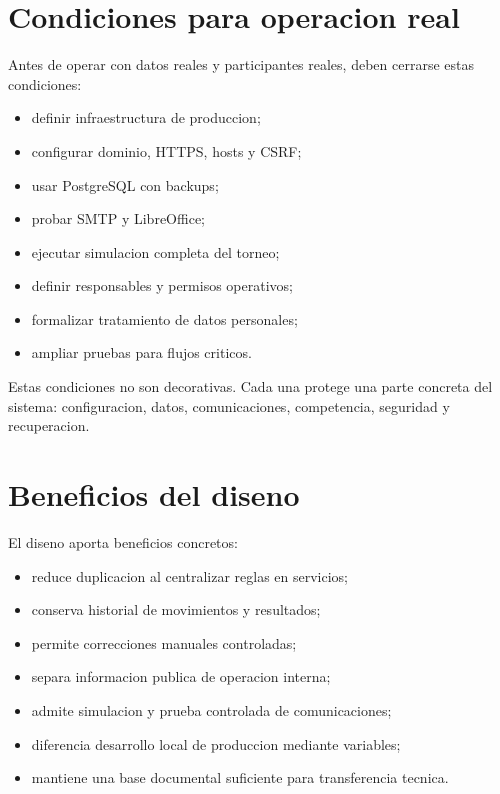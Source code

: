 \section{Condiciones para operacion real}
\label{sec:conclusiones-operacion}

Antes de operar con datos reales y participantes reales, deben cerrarse estas condiciones:

\begin{itemize}
  \item definir infraestructura de produccion;
  \item configurar dominio, HTTPS, hosts y CSRF;
  \item usar PostgreSQL con backups;
  \item probar SMTP y LibreOffice;
  \item ejecutar simulacion completa del torneo;
  \item definir responsables y permisos operativos;
  \item formalizar tratamiento de datos personales;
  \item ampliar pruebas para flujos criticos.
\end{itemize}

Estas condiciones no son decorativas. Cada una protege una parte concreta del sistema: configuracion, datos, comunicaciones, competencia, seguridad y recuperacion.

\section{Beneficios del diseno}
\label{sec:conclusiones-beneficios}

El diseno aporta beneficios concretos:

\begin{itemize}
  \item reduce duplicacion al centralizar reglas en servicios;
  \item conserva historial de movimientos y resultados;
  \item permite correcciones manuales controladas;
  \item separa informacion publica de operacion interna;
  \item admite simulacion y prueba controlada de comunicaciones;
  \item diferencia desarrollo local de produccion mediante variables;
  \item mantiene una base documental suficiente para transferencia tecnica.
\end{itemize}

